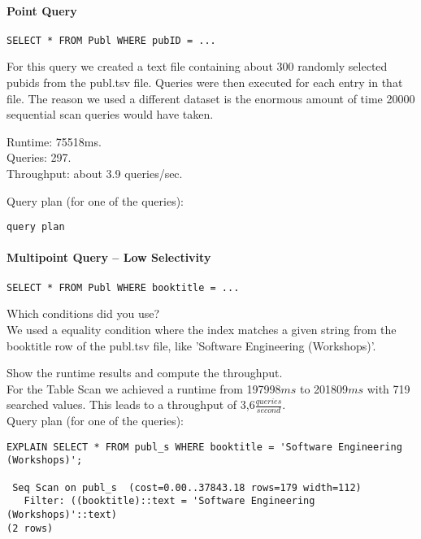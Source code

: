 \documentclass[11pt]{scrartcl}
\begin{document}
\paragraph{Point Query}

{\small
\begin{verbatim}
SELECT * FROM Publ WHERE pubID = ...
\end{verbatim}
}

\noindent
For this query we created a text file containing about 300 randomly selected pubids from the publ.tsv file. Queries were then executed for each entry in that file. The reason we used a different dataset is the enormous amount of time 20000 sequential scan queries would have taken.

\smallskip\noindent
Runtime: 75518ms.\\
Queries: 297.\\
Throughput: about 3.9 queries/sec.

\smallskip\noindent
Query plan (for one of the queries):
{\small
\begin{verbatim}
query plan
\end{verbatim}
}


\paragraph{Multipoint Query -- Low Selectivity}

{\small
\begin{verbatim}
SELECT * FROM Publ WHERE booktitle = ...
\end{verbatim}
}

\noindent
Which conditions did you use?\\
We used a equality condition where the index matches a given string from the booktitle row of the publ.tsv file, like 'Software Engineering (Workshops)'.

\smallskip\noindent
Show the runtime results and compute the throughput.\\
For the Table Scan we achieved a runtime from 197998$ms$ to 201809$ms$ with 719 searched values.
This leads to a throughput of 3,6$\frac{queries}{second}$.\\

\smallskip\noindent
Query plan (for one of the queries):
\begin{verbatim}
EXPLAIN SELECT * FROM publ_s WHERE booktitle = 'Software Engineering (Workshops)';

 Seq Scan on publ_s  (cost=0.00..37843.18 rows=179 width=112)
   Filter: ((booktitle)::text = 'Software Engineering (Workshops)'::text)
(2 rows)
\end{verbatim}
\end{document}
